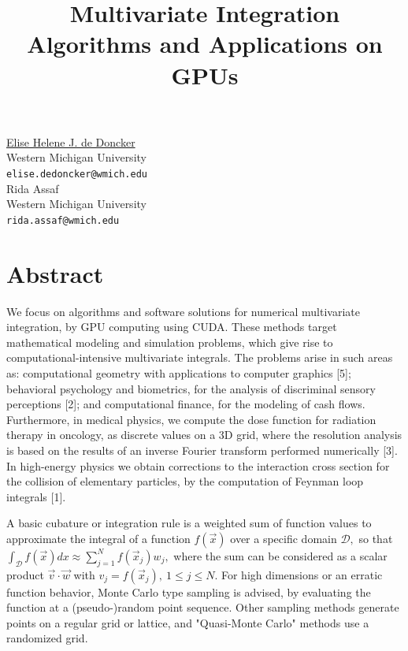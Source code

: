 \documentclass[article, A4, 11pt]{llncs}%
\begin{document}
\title{Multivariate Integration Algorithms and Applications on GPUs}
 \author{} \institute{}
\maketitle
\vspace{-2mm}
\begin{center}
{\large \underline{Elise Helene J. de Doncker}}\\
Western Michigan University\\
{\tt elise.dedoncker@wmich.edu}
\\ \vspace{4mm}
{\large Rida Assaf}\\
Western Michigan University\\
{\tt rida.assaf@wmich.edu}
\end{center}

\section*{Abstract}
We focus on algorithms and software solutions for numerical multivariate integration, by GPU computing using CUDA. These methods target mathematical modeling and simulation problems, which give rise to computational-intensive multivariate integrals. The problems arise in such areas as: computational geometry with applications to computer graphics [5]; behavioral psychology and biometrics, for the analysis of discriminal sensory perceptions [2]; and computational finance, for the modeling of cash flows. Furthermore, in medical physics, we compute the dose function for radiation therapy in oncology, as discrete values on a 3D grid, where the resolution analysis is based on the results of an inverse Fourier transform performed numerically [3]. In high-energy physics we obtain corrections to the interaction cross section for the collision of elementary particles, by the computation of Feynman loop integrals [1]. 

A basic cubature or integration rule is a weighted sum of function values to approximate the integral of a function $f(\vec{x})$ over a specific domain ${\mathcal D},$ so that
$\int_{\mathcal D} f(\vec{x}) dx \approx \sum_{j=1}^N f(\vec{x}_j) w_j,$ where the sum can be considered as a scalar product $\vec{v}\cdot \vec{w}$ with $v_j =  f(\vec{x}_j), ~1\le j\le N.$ For high dimensions or an erratic function behavior, Monte Carlo type sampling is advised, by evaluating the function at a (pseudo-)random point sequence. Other sampling methods generate points on a regular grid or lattice, and "Quasi-Monte Carlo" methods use a randomized grid. 
\end{document}
